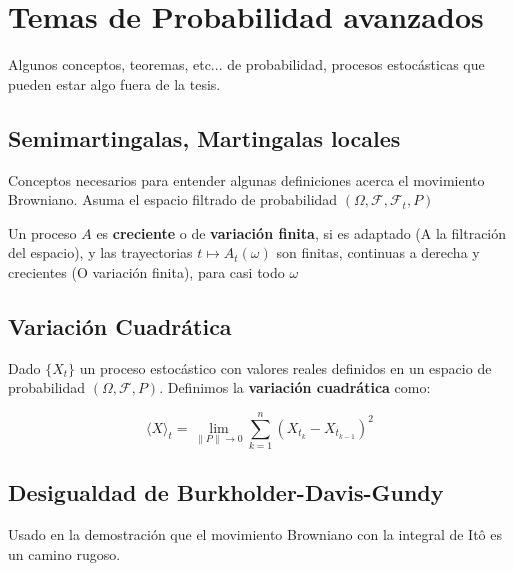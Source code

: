 \section{Temas de Probabilidad avanzados}

Algunos conceptos, teoremas, etc... de probabilidad, procesos estocásticas que pueden estar algo fuera de la tesis.

\subsection{Semimartingalas, Martingalas locales}

Conceptos necesarios para entender algunas definiciones acerca el movimiento Browniano. Asuma el espacio filtrado de probabilidad $(\Omega, \mathcal{F}, \mathcal{F}_t, P)$

\begin{boxDef}
	Un proceso $A$ es \textbf{creciente} o de \textbf{variación finita}, si es adaptado (A la filtración del espacio), y las trayectorias $t \mapsto A_t (\omega)$ son finitas, continuas a derecha y crecientes (O variación finita), para casi todo $\omega$
\end{boxDef} 


\subsection{Variación Cuadrática}

\begin{boxDef}
	Dado $\{  X_t \}$ un proceso estocástico con valores reales definidos en un espacio de probabilidad $(\Omega, \mathcal{F}, P)$. Definimos la \textbf{variación cuadrática} como:

	\[
		\langle X \rangle_t = \lim_{ \lVert P \rVert \rightarrow 0 } \sum_{k = 1}^n (X_{t_k} - X_{t_{k-1}})^2	
	\]

\end{boxDef}


\subsection{Desigualdad de Burkholder-Davis-Gundy}

Usado en la demostración que el movimiento Browniano con la integral de Itô es un camino rugoso.



